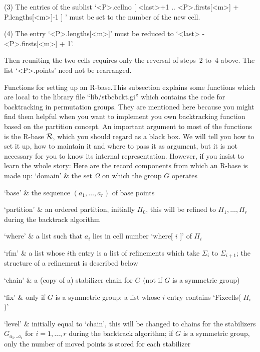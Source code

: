 (3) The entries of the sublist `<P>.cellno{ [ <last>+1 .. <P>.firsts[<m>]
+ P.lengths[<m>]-1 ] }' must be set to the number of the new cell.

(4) The entry    `<P>.lengths[<m>]'  must   be  reduced  to   `<last>   -
<P>.firsts[<m>] + 1'.

Then reuniting the  two cells requires  only the reversal of steps~2 to~4
above. The list `<P>.points' need not be rearranged.

\medskip%
{\bsf Functions for setting up an  R-base.}\quad This subsection explains
some   {\GAP}  functions  which  are     local   to the  library     file
``lib/stbcbckt.gi''   which   contains  the   code  for  backtracking  in
permutation  groups. They are mentioned here  because you might find them
helpful when you want to implement you own backtracking function based on
the partition concept. An important argument to most  of the functions is
the R-base $\cal R$, which you should regard as a black box. We will tell
you how   to set it  up, how   to maintain  it  and where  to pass  it as
argument,    but it is  not  necessary   for you  to   know its  internal
representation. However, if you insist to learn the whole story: Here are
the record components from which an R-base is made up:
\beginitems
`domain' &
    the set $\Omega$ on which the group $G$ operates

`base' &
    the sequence $(a_1,\ldots,a_r)$ of base points

`partition' &
    an  ordered  partition, initially  $\Pi_0$, this  will be  refined to
    $\Pi_1,\ldots,\Pi_r$ during the backtrack algorithm

`where' &
    a list such that $a_i$ lies in cell number `where[ $i$ ]' of $\Pi_i$

`rfm' &
    a    list whose $i$th entry  is   a  list of   refinements which take
    $\Sigma_i$  to $\Sigma_{i+1}$;  the    structure of a  refinement  is
    described below

`chain' &
    a (copy of a) stabilizer  chain for $G$ (not  if  $G$ is a  symmetric
    group)

`fix' &
    only if  $G$ is a  symmetric group:  a list whose  $i$ entry contains
    `Fixcells( $\Pi_i$ )'

`level' &
    initially equal to `chain',  this will be changed  to chains  for the
    stabilizers  $G_{a_1\dots  a_i}$    for  $i=1,\ldots,r$  during   the
    backtrack algorithm; if $G$ is a  symmetric group, only the number of
    moved points is stored for each stabilizer

